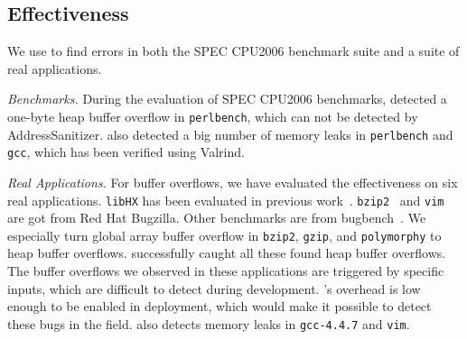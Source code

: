 \subsection{Effectiveness}
\label{sec:effect}


We use \doubletake{} to find errors in both the SPEC CPU2006
benchmark suite and a suite of real applications.

\emph{Benchmarks.} During the evaluation of SPEC CPU2006 benchmarks, \doubletake{} detected a one-byte heap buffer overflow
 in \texttt{perlbench}, which can not be detected by AddressSanitizer. \doubletake{} also detected a big number of memory leaks in \texttt{perlbench} and \texttt{gcc}, which has been verified using Valrind.

\emph{Real Applications.} For buffer overflows, we have evaluated the effectiveness on  six real applications. \texttt{libHX} has been evaluated in previous work~\cite{overflow:Cruiser}. \texttt{bzip2}~\cite{bzip2overflow} and \texttt{vim} ~\cite{vimoverflow} are got from Red Hat Bugzilla. Other benchmarks are from bugbench~\cite{bugbench}. We especially turn global array buffer overflow in \texttt{bzip2}, \texttt{gzip}, and \texttt{polymorphy} to heap buffer overflows. \doubletake{} successfully caught all these found heap buffer overflows. The buffer overflows we observed in these applications are triggered by specific inputs, which are difficult to detect during development. \doubletake{}'s overhead is low enough to be enabled in deployment, which would make it possible to detect these bugs in the field.
\doubletake{} also detects memory leaks in \texttt{gcc-4.4.7} and \texttt{vim}.